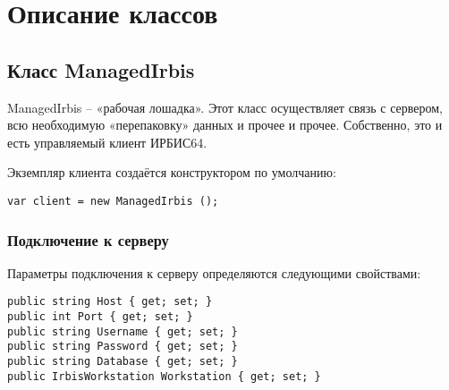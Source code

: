 \chapter{Описание классов}

\section{Класс ManagedIrbis}

ManagedIrbis – «рабочая лошадка». Этот класс осуществляет связь с сервером, всю необходимую «перепаковку» данных и прочее и прочее. Собственно, это и есть управляемый клиент ИРБИС64.

Экземпляр клиента создаётся конструктором по умолчанию:
\begin{lstlisting}
var client = new ManagedIrbis ();
\end{lstlisting}

\subsection{Подключение к серверу}

Параметры подключения к серверу определяются следующими свойствами:

\begin{lstlisting}
public string Host { get; set; }
public int Port { get; set; }
public string Username { get; set; }
public string Password { get; set; }
public string Database { get; set; }
public IrbisWorkstation Workstation { get; set; }
\end{lstlisting}